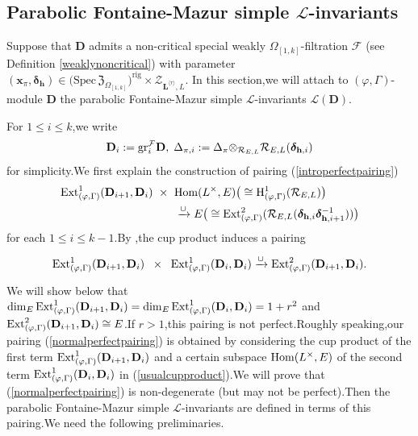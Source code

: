 \documentclass[SecEq,CM,GP]{degruyter-crelle} %
\theoremstyle{plain}
\newcommand{\bmdel}{{ \bm{\delta}_\bh}}
\newcommand{\Dpik}{{\mathbf{D}}}
\newcommand{\ext}{{\rm Ext}}
\newcommand{\gr}{{\rm gr}}
\newcommand{\homo}{{\rm Hom}}
\newcommand{\hH}{{\mathrm{H}}}
\newcommand{\lrr}{{\langle r\rangle}}
\newcommand{\omepik}{\Omega_{[1,k]}}
\newcommand{\rigchl}{{\mathcal{Z}_{\bL^{\lrr},L}}}
\newcommand{\sbanpik}{{\big(\mathrm{Spec}\hspace{2pt}\mathfrak{Z}_{\omepik}\big)^{\mathrm{rig}}}}
\newcommand{\tee}{{{\otimes}_{\cR_{E,L}}}}
\newcommand{\bL}{{\mathbf{L}}}
\newcommand{\bx}{{\mathbf{x}}}
\newcommand{\bh}{{\mathbf{h}}}
\newcommand{\cR}{\mathcal R}
\newcommand{\cF}{\mathcal F}
\newcommand{\sL}{\mathcal L}
\begin{document}
\subsection{Parabolic Fontaine-Mazur  simple \texorpdfstring{$\sL$}{Lg}-invariants}\label{dfnFMparalINVSECTION}Suppose that $\Dpik$ admits a non-critical special weakly $\omepik$-filtration $\cF$ (see Definition \ref{weaklynoncritical}) with parameter $(\bx_{\pi},\bmdel)\in \sbanpik\times\rigchl $. In this section,\;we will attach to $(\varphi,\Gamma)$-module $\Dpik$ the parabolic Fontaine-Mazur simple $\sL$-invariants $\sL(\Dpik)$.\;

For $1\leq i\leq k$,\;we write $$\Dpik_i:=\gr_{i}^{\cF}\Dpik,\;\Delta_{\pi,i}:={\Delta_\pi}\tee \cR_{E,L}(\bm{\delta}_{\bh,i})$$ for simplicity.\;We first explain the construction of 
pairing (\ref{introperfectpairing})
\begin{equation}\label{normalperfectpairing}
\begin{aligned}
	\ext^1_{(\varphi,\Gamma)}(\Dpik_{i+1},\Dpik_{i})  \;\;\times\;\;  &\homo(L^\times,E) \big(\cong \hH^1_{(\varphi,\Gamma)}(\cR_{E,L})\big) \\      &\xrightarrow{\cup}
	E\big(\cong\ext^2_{(\varphi,\Gamma)}(\cR_{E,L}(\bm{\delta}_{\bh,i}\bm{\delta}^{-1}_{\bh,i+1}))\big)
\end{aligned}
\end{equation}
for each $1\leq i\leq k-1$.\;By \cite{liu2007cohomology},\;the cup product induces a pairing
\begin{equation}\label{usualcupproduct}
\xymatrix@C=5ex{
	\ext^1_{(\varphi,\Gamma)}(\Dpik_{i+1},\Dpik_{i})    \;\;\times\;\;  \ext^1_{(\varphi,\Gamma)}(\Dpik_{i},\Dpik_{i})  \xrightarrow{\cup}  \ext^2_{(\varphi,\Gamma)}(\Dpik_{i+1},\Dpik_{i}) .}
\end{equation}
We will show below that $\dim_E\ext^1_{(\varphi,\Gamma)}(\Dpik_{i+1},\Dpik_{i})=\dim_E\ext^1_{(\varphi,\Gamma)}(\Dpik_{i},\Dpik_{i})=1+r^2$ and \\$\ext^2_{(\varphi,\Gamma)}(\Dpik_{i+1},\Dpik_{i})\cong E$.\;If $r>1$,\;this pairing is not perfect.\;Roughly speaking,\;our pairing (\ref{normalperfectpairing}) is obtained by considering the cup product of the first term $\ext^1_{(\varphi,\Gamma)}(\Dpik_{i+1},\Dpik_{i})$ and a certain subspace $\homo(L^\times,E)$ of the second term  $\ext^1_{(\varphi,\Gamma)}(\Dpik_{i},\Dpik_{i})$ in (\ref{usualcupproduct}).\;We will prove that (\ref{normalperfectpairing}) is non-degenerate (but may not be perfect).\;Then the parabolic Fontaine-Mazur  simple $\sL$-invariants are defined in terms of this pairing.\;We need the following preliminaries.\;
\end{document}
